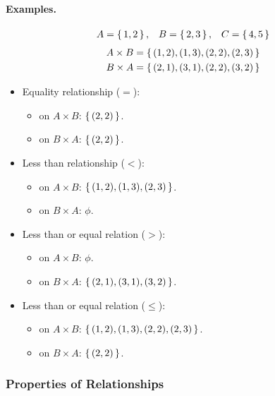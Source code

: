 \paragraph{Examples. }
\begin{align*}
        \space A = \set{1,2} , && B = \set{2,3} , && C = \set{4,5}
\end{align*}
\begin{align*}
        A \times B = \set{(1,2),(1,3),(2,2),(2,3)} \\
        B \times A = \set{(2,1),(3,1),(2,2),(3,2)} \\
\end{align*}
\begin{itemize}
    \item Equality relationship ($=$):
        \begin{itemize}
            \item  on $A \times B$: $\set{(2,2)}$.
            \item on $B \times A$: $\set{(2,2)}$.
        \end{itemize}
    \item Less than relationship ($<$):
        \begin{itemize}
            \item  on $A \times B$: $\set{(1,2),(1,3),(2,3)}$.
            \item  on $B \times A$: $\phi$.
        \end{itemize}
    \item Less than or equal relation ($>$):
        \begin{itemize}
            \item  on $A \times B$: $\phi$.
            \item  on $B \times A$: $\set{(2,1),(3,1),(3,2)}$.
        \end{itemize}
    \item Less than or equal relation ($\leq$):
        \begin{itemize}
            \item  on $A \times B$: $\set{(1,2),(1,3),(2,2),(2,3)}$.
            \item  on $B \times A$: $\set{(2,2)}$.
        \end{itemize}
\end{itemize}

\subsubsection{Properties of Relationships}

